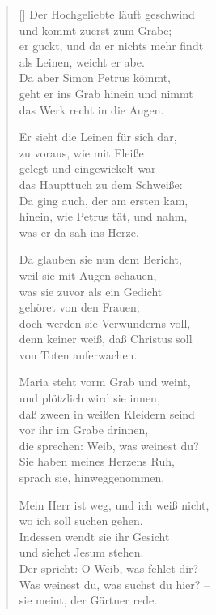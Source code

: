\begin{multicols}{2}
\begin{verse}[\versewidth]
 Der Hochgeliebte läuft geschwind\\
und kommt zuerst zum Grabe;\\
er guckt, und da er nichts mehr findt\\
als Leinen, weicht er abe.\\
Da aber Simon Petrus kömmt,\\
geht er ins Grab hinein und nimmt\\
das Werk recht in die Augen.

 Er sieht die Leinen für sich dar,\\
zu voraus, wie mit Fleiße\\
gelegt und eingewickelt war\\
das Haupttuch zu dem Schweiße:\\
Da ging auch, der am ersten kam,\\
hinein, wie Petrus tät, und nahm,\\
was er da sah ins Herze.

 Da glauben sie nun dem Bericht,\\
weil sie mit Augen schauen,\\
was sie zuvor als ein Gedicht\\
gehöret von den Frauen;\\
doch werden sie Verwunderns voll,\\
denn keiner weiß, daß Christus soll\\
von Toten auferwachen.

 Maria steht vorm Grab und weint,\\
und plötzlich wird sie innen,\\
daß zween in weißen Kleidern seind\\
vor ihr im Grabe drinnen,\\
die sprechen: Weib, was weinest du?\\
Sie haben meines Herzens Ruh,\\
sprach sie, hinweggenommen.

 Mein Herr ist weg, und ich weiß nicht,\\
wo ich soll suchen gehen.\\
Indessen wendt sie ihr Gesicht\\
und siehet Jesum stehen.\\
Der spricht: O Weib, was fehlet dir?\\
Was weinest du, was suchst du hier? –\\
sie meint, der Gärtner rede.


\end{verse}
\end{multicols}
